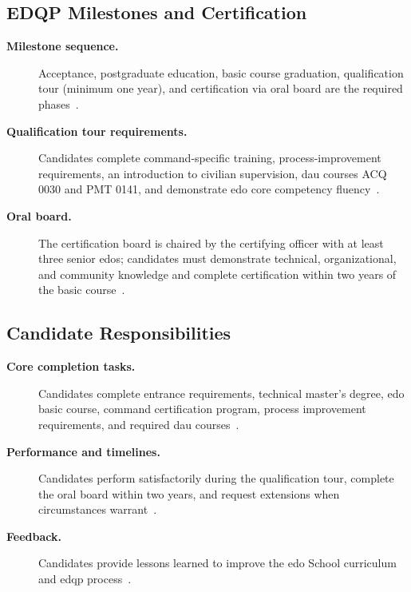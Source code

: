 \documentclass[../main.tex]{subfiles}
\begin{document}
\subsection{EDQP Milestones and Certification}
\begin{description}
  \item[\textbf{Milestone sequence.}] Acceptance, postgraduate education, basic course graduation,
  qualification tour (minimum one year), and certification via oral board are the required phases~\autocite{edo-5-2-2-edqp-2025}.
  \item[\textbf{Qualification tour requirements.}] Candidates complete command-specific training,
  process-improvement requirements, an introduction to civilian supervision, \ac{dau} courses ACQ 0030
  and PMT 0141, and demonstrate \ac{edo} core competency fluency~\autocite{edo-5-2-2-edqp-2025}.
  \item[\textbf{Oral board.}] The certification board is chaired by the certifying officer with at least three
  senior \ac{edo}s; candidates must demonstrate technical, organizational, and community knowledge and
  complete certification within two years of the basic course~\autocite{edo-5-2-2-edqp-2025}.
\end{description}

\subsection{Candidate Responsibilities}
\begin{description}
  \item[\textbf{Core completion tasks.}] Candidates complete entrance requirements, technical master's
  degree, \ac{edo} basic course, command certification program, process improvement requirements, and
  required \ac{dau} courses~\autocite{edo-5-2-2-edqp-2025}.
  \item[\textbf{Performance and timelines.}] Candidates perform satisfactorily during the qualification tour,
  complete the oral board within two years, and request extensions when circumstances warrant~\autocite{edo-5-2-2-edqp-2025}.
  \item[\textbf{Feedback.}] Candidates provide lessons learned to improve the \ac{edo} School curriculum and
  \ac{edqp} process~\autocite{edo-5-2-2-edqp-2025}.
\end{description}
\end{document}
